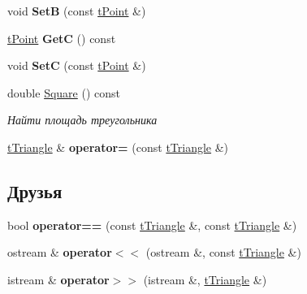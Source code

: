\begin{DoxyCompactItemize}
\item 
\mbox{\label{classtTriangle_a6c694e33bc770411e93a43fd4066e198}} 
void {\bfseries SetB} (const \hyperlink{classtPoint}{t\+Point} \&)
\item 
\mbox{\label{classtTriangle_a1f282bae86e8a7c0e0d03c1daa1203cf}} 
\hyperlink{classtPoint}{t\+Point} {\bfseries GetC} () const
\item 
\mbox{\label{classtTriangle_a918d25521066423811a5c8c6c065877d}} 
void {\bfseries SetC} (const \hyperlink{classtPoint}{t\+Point} \&)
\item 
\mbox{\label{classtTriangle_a97950f707d11df41c330fe3c9f87eefc}} 
double \hyperlink{classtTriangle_a97950f707d11df41c330fe3c9f87eefc}{Square} () const
\begin{DoxyCompactList}\small\item\em Найти площадь треугольника \end{DoxyCompactList}\item 
\mbox{\label{classtTriangle_a130f7ecd50933a9dbcc1914fc4e31ac0}} 
\hyperlink{classtTriangle}{t\+Triangle} \& {\bfseries operator=} (const \hyperlink{classtTriangle}{t\+Triangle} \&)
\end{DoxyCompactItemize}
\subsection*{Друзья}
\begin{DoxyCompactItemize}
\item 
\mbox{\label{classtTriangle_a95e318dd03b5dd2124a3b52fa6e5a398}} 
bool {\bfseries operator==} (const \hyperlink{classtTriangle}{t\+Triangle} \&, const \hyperlink{classtTriangle}{t\+Triangle} \&)
\item 
\mbox{\label{classtTriangle_a52e0f64418a864f97e0ef833d3c054c0}} 
ostream \& {\bfseries operator$<$$<$} (ostream \&, const \hyperlink{classtTriangle}{t\+Triangle} \&)
\item 
\mbox{\label{classtTriangle_a5b1b8bacb64f207e4d8c9bc5513c8335}} 
istream \& {\bfseries operator$>$$>$} (istream \&, \hyperlink{classtTriangle}{t\+Triangle} \&)
\end{DoxyCompactItemize}


